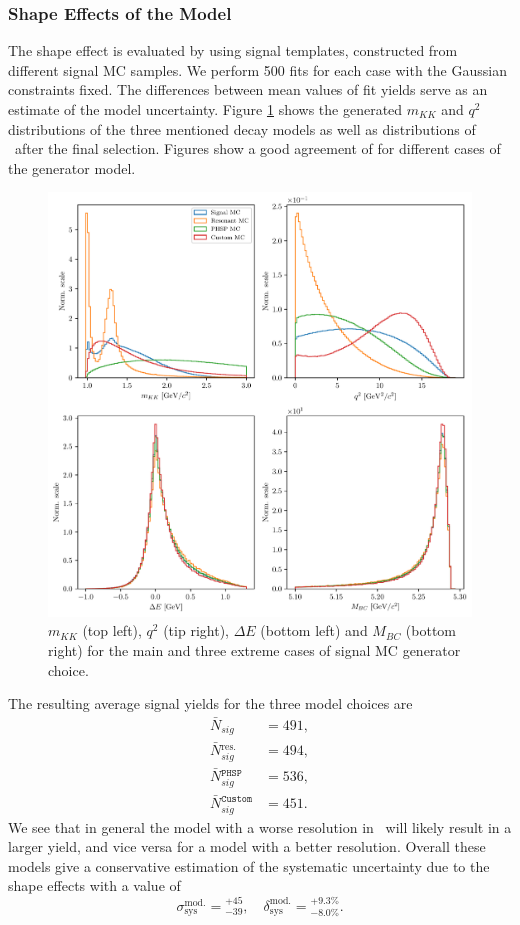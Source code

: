 \subsubsection{Shape Effects of the Model}
The shape effect is evaluated by using signal templates, constructed from different signal MC samples. We perform 500 fits for each case with the Gaussian constraints fixed. The differences between mean values of fit yields serve as an estimate of the model uncertainty. Figure \ref{fig:model_cases} shows the generated $m_{KK}$ and $q^2$ distributions of the three mentioned decay models as well as distributions of \vars~after the final selection. Figures show a good agreement of \vars for different cases of the generator model.
\begin{figure}[H]
	\centering
	\captionsetup{width=0.8\linewidth}
	\includegraphics[width=\linewidth]{fig/model_cases}
	\caption{$m_{KK}$ (top left), $q^2$ (tip right), $\Delta E$ (bottom left) and $M_{BC}$ (bottom right) for the main and three extreme cases of signal MC generator choice.}
	\label{fig:model_cases}
\end{figure}
The resulting average signal yields for the three model choices are
\begin{align}
\bar N {}_{sig} &= 491, \\
\bar N {}_{sig}^{\mathrm{res.}} &= 494, \\
\bar N {}_{sig}^{\mathtt{PHSP}} &= 536, \\
\bar N {}_{sig}^{\mathtt{Custom}} &= 451.
\end{align}
We see that in general the model with a worse resolution in \vars~will likely result in a larger yield, and vice versa for a model with a better resolution. Overall these models give a conservative estimation of the systematic uncertainty due to the shape effects with a value of 
\begin{equation}
\sigma_{\mathrm{sys}}^{\mathrm{mod.}} = {}^{+45}_{-39},\quad \delta_{\mathrm{sys}}^{\mathrm{mod.}} = {}^{+9.3\%}_{-8.0\%}.
\end{equation}

